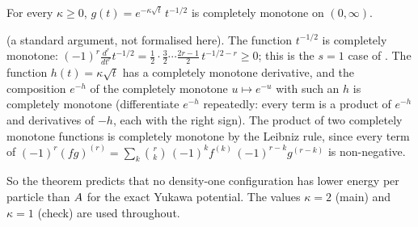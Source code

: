 \begin{proposition}\label{prop:yukawa-cm}
For every $\kappa\ge0$, $g(t)=e^{-\kappa\sqrt t}\,t^{-1/2}$ is completely monotone on $(0,\infty)$.
\end{proposition}
\begin{humanproof}
\tierC{} (a standard argument, not formalised here). The function $t^{-1/2}$ is completely monotone:
$(-1)^r\frac{d^r}{dt^r}t^{-1/2}=\frac12\cdot\frac32\cdots\frac{2r-1}2\,t^{-1/2-r}\ge0$; this is the $s=1$ case of
. The function $h(t)=\kappa\sqrt t$ has a completely monotone derivative, and the composition
$e^{-h}$ of the completely monotone $u\mapsto e^{-u}$ with such an $h$ is completely monotone (differentiate
$e^{-h}$ repeatedly: every term is a product of $e^{-h}$ and derivatives of $-h$, each with the right sign). The product
of two completely monotone functions is completely monotone by the Leibniz rule, since every term of
$(-1)^r(fg)^{(r)}=\sum_k\binom rk\,(-1)^kf^{(k)}\,(-1)^{r-k}g^{(r-k)}$ is non-negative.
\end{humanproof}

So the theorem predicts that no density-one configuration has lower energy per particle than $A$ for the exact
Yukawa potential. The values $\kappa=2$ (main) and $\kappa=1$ (check) are used throughout.


